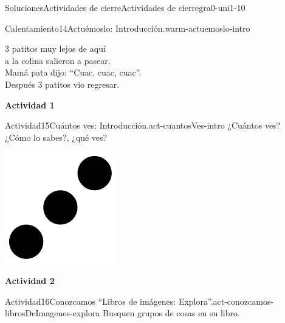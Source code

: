 \documentclass[twoside,10pt,]{article}
\begin{document}
\begin{solutions-section}{Soluciones}{Actividades de cierre}{}{Actividades de cierre}{}{}{gra0-uni1-10}
\begin{explorationsolution}{Calentamiento}{14}{Actuémoslo: Introducción.}{warm-actuemoslo-intro}
\begin{image}{0.2}{0.6}{0.2}{}
\end{image}%
%
\par
3 patitos muy lejos de aquí\\
 a la colina salieron a pasear.\\
 Mamá pata dijo: “Cuac, cuac, cuac”.\\
 Después 3 patitos vio regresar.%
\end{explorationsolution}%
\par\medskip
\noindent\textbf{\large{}\space\textperiodcentered\space{}Actividad 1}
\begin{activitysolution}{Actividad}{15}{Cuántos ves: Introducción.}{act-cuantosVes-intro}%
¿Cuántos ves?\\
 ¿Cómo lo sabes?, ¿qué ves?%
\begin{image}{0}{1}{0}{}%
\includegraphics[width=\linewidth]{external/svg-source/tikz-file-148150.pdf}
\end{image}%
\end{activitysolution}%
\par\medskip
\noindent\textbf{\large{}\space\textperiodcentered\space{}Actividad 2}
\begin{activitysolution}{Actividad}{16}{Conozcamos “Libros de imágenes: Explora”.}{act-conozcamos-librosDeImagenes-explora}%
Busquen grupos de cosas en su libro.%
\end{activitysolution}%

\end{solutions-section}
\end{document}
